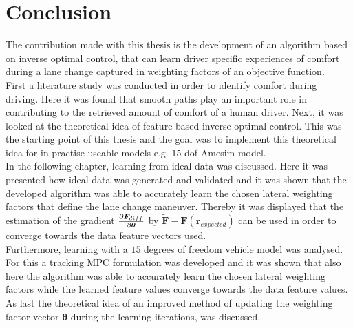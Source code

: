\chapter{Conclusion}
\label{cha:conclusion}
The contribution made with this thesis is the development of an algorithm based on inverse optimal control, that can learn driver specific experiences of comfort during a lane change captured in weighting factors of an objective function.\\
First a literature study was conducted in order to identify comfort during driving. Here it was found that smooth paths play an important role in contributing to the retrieved amount of comfort of a human driver. Next, it was looked at the theoretical idea of feature-based inverse optimal control. This was the starting point of this thesis and the goal was to implement this theoretical idea for in practise useable models e.g. $15$ dof Amesim model.\\
In the following chapter, learning from ideal data was discussed. Here it was presented how ideal data was generated and validated and it was shown that the developed algorithm was able to accurately learn the chosen lateral weighting factors that define the lane change maneuver. Thereby it was displayed that the estimation of the gradient $\pdv{\bm{F}_{diff}}{\bm{\theta}}$ by $ \bm{\tilde{F}} - \bm{F}(\bm{r}_{expected})$ can be used in order to converge towards the data feature vectors used.\\
Furthermore, learning with a $15$ degrees of freedom vehicle model was analysed. For this a tracking MPC formulation was developed and it was shown that also here 
the algorithm was able to accurately learn the chosen lateral weighting factors while the learned feature values converge towards the data feature values.\\
As last the theoretical idea of an improved method of updating the weighting factor vector $\bm{\theta}$ during the learning iterations, was discussed.\\

